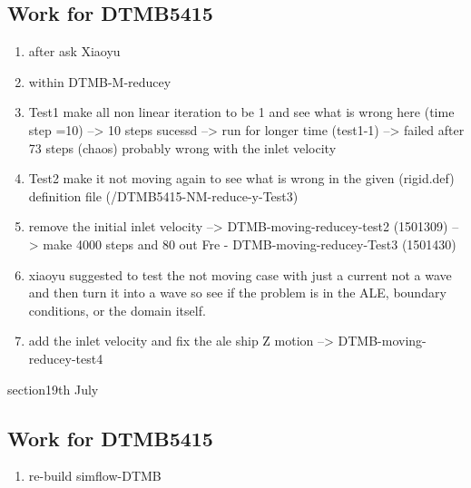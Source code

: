 \documentclass[12pt]{article} %
\begin{document}
\subsection{Work for DTMB5415}
\begin{enumerate}
    \item after ask Xiaoyu
    \item within DTMB-M-reducey
    \item Test1 make all non linear iteration to be 1 and see what is wrong here (time step =10) --> 10 steps sucessd --> run for longer time (test1-1) --> failed after 73 steps (chaos)
    probably wrong with the inlet velocity
    \item Test2 make it not moving again to see what is wrong in the given (rigid.def) definition file (/DTMB5415-NM-reduce-y-Test3)
    \item remove the initial inlet velocity --> DTMB-moving-reducey-test2 (1501309) --> make 4000 steps and 80 out Fre - DTMB-moving-reducey-Test3 (1501430)
    \item xiaoyu suggested to test the not moving case with just a current not a wave and then turn it into a wave so see if the problem is in the ALE, boundary conditions, or the domain itself.
    \item add the inlet velocity and fix the ale ship Z motion --> DTMB-moving-reducey-test4
\end{enumerate}
section{19th July}
\subsection{Work for DTMB5415}
\begin{enumerate}
    \item re-build simflow-DTMB
\end{enumerate}
\end{document}
